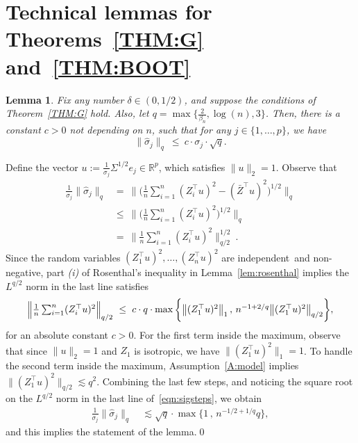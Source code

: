 \documentclass[aos,preprint]{imsart}
\numberwithin{equation}{section}
\theoremstyle{plain}
\newtheorem{lemma}{Lemma}[section]
\newcommand{\R}{\mathbb{R}}
\renewcommand{\hat}[1]{\widehat{#1}}
\newcommand{\ttop}{^{\top}}
\newcommand{\ts}{\textstyle}
\newcommand{\1}{{\bf{1}}}
\newcommand{\0}{\mathbf{0}}
\begin{document}
\section{Technical lemmas for Theorems~\ref{THM:G} and~\ref{THM:BOOT}}\label{app:technical}
\begin{lemma}\label{lem:sighatrnorm}
Fix any number $\delta\in(0,1/2)$, and suppose the conditions of Theorem~\ref{THM:G} hold. Also, let $q=\max\{\frac{2}{\beta_n}, \log(n),3\}$. Then, there is a constant $c>0$ not depending on $n$, such that for any $j\in\{1,\dots,p\}$, we have
\begin{equation}
\|\hat\sigma_{j}\|_q \ \leq \ c \cdot \sigma_j \cdot \sqrt{q}.
\end{equation}
\end{lemma}
\proof Define the vector $u:=\frac{1}{\sigma_j}\Sigma^{1/2}e_j\in\R^p$, which satisfies $\|u\|_2=1$. Observe that
\begin{equation}\label{eqn:sigsteps}
\begin{split}
\ts\frac{1}{\sigma_j}\|\hat\sigma_{j}\|_q &= \ \Bigg\|\Big(\ts\frac 1n \sum_{i=1}^n (Z_i\ttop u)^2-(\bar Z\ttop u)^2\Big)^{1/2}\Bigg\|_q\\[0.2cm]
%
&\leq \ \bigg\|\Big(\ts\frac 1n \sum_{i=1}^n ( Z_i\ttop u)^2\Big)^{1/2}\bigg\|_q\\[0.2cm]%
&= \ \Big\|\ts\frac 1n \sum_{i=1}^n (Z_i\ttop u)^2\Big\|_{q/2}^{1/2}\ .
\end{split}
\end{equation}
Since the random variables $(Z_1\ttop u)^2,\dots, (Z_n\ttop u)^2$ are independent~and non-negative, part \emph{(i)} of Rosenthal's inequality in Lemma~\ref{lem:rosenthal} implies the $L^{q/2}$ norm in the last line satisfies
\begin{equation}
\small
 \Big\|\ts\frac 1n \sum_{i=1}^n (Z_i\ttop u)^2\Big\|_{q/2} \ \leq \ c \cdot q \cdot \max\bigg\{\big\|(Z_1\ttop u)^2\big\|_1\, , \, n^{-1+2/q} \big\| (Z_1\ttop u)^2\big\|_{q/2}\bigg\},
\end{equation}
for an absolute constant $c>0$.
For the first term inside the maximum, observe that since $\|u\|_2=1$ and $Z_1$ is isotropic, we have $\|(Z_1\ttop u)^2\|_1=1$. To handle the second term inside the maximum, Assumption~\ref{A:model} implies $\|(Z_1\ttop u)^2\|_{q/2}\lesssim q^2$.
Combining the last few steps, and noticing the square root on the $L^{q/2}$ norm in the last line of~\eqref{eqn:sigsteps}, we obtain 
\begin{equation}
\begin{split}
\ts\frac{1}{\sigma_j}\|\hat\sigma_{j}\|_q & \ \lesssim \sqrt q \cdot \max\Big\{ 1\, , \, n^{-1/2+1/q}q\Big\},
\end{split}
\end{equation}
and this implies the statement of the lemma.\qed
\end{document}
